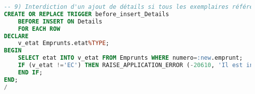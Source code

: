 \documentclass[10pt, oneside]{article}
\begin{document}
\begin{lstlisting}[language=sql, title=Question 9, label=QVI9]
-- 9) Interdiction d'un ajout de détails si tous les exemplaires référencés sur une fiche ont été rendus
CREATE OR REPLACE TRIGGER before_insert_Details
	BEFORE INSERT ON Details
	FOR EACH ROW
DECLARE 
	v_etat Emprunts.etat%TYPE;
BEGIN
	SELECT etat INTO v_etat FROM Emprunts WHERE numero=:new.emprunt;
	IF (v_etat !='EC') THEN RAISE_APPLICATION_ERROR (-20610, 'Il est interdit d''ajouter des détails pour cet exemplaire');
	END IF;
END;
/
\end{lstlisting}
\end{document}
